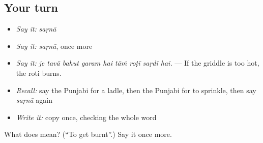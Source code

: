\subsection*{Your turn}
\begin{itemize}
\raggedright
  \item \emph{Say it:} \emph{saṛnā}
  \item \emph{Say it:} \emph{saṛnā}, once more
  \item \emph{Say it:} \emph{je tavā bahut garam hai tāṁ roṭī saṛdī hai.} — If the griddle is too hot, the roti burns.
  \item \emph{Recall:} say the Punjabi for a ladle, then the Punjabi for to sprinkle, then say \emph{saṛnā} again
  \item \emph{Write it:} copy \textbf{} once, checking the whole word
\end{itemize}

\begin{tcolorbox}[breakable,colback=teal!4,colframe=teal!35!black,title={Before you move on}]
What does  mean? (\textquotedblleft{}To get burnt\textquotedblright{}.) Say it once more.
\end{tcolorbox}
